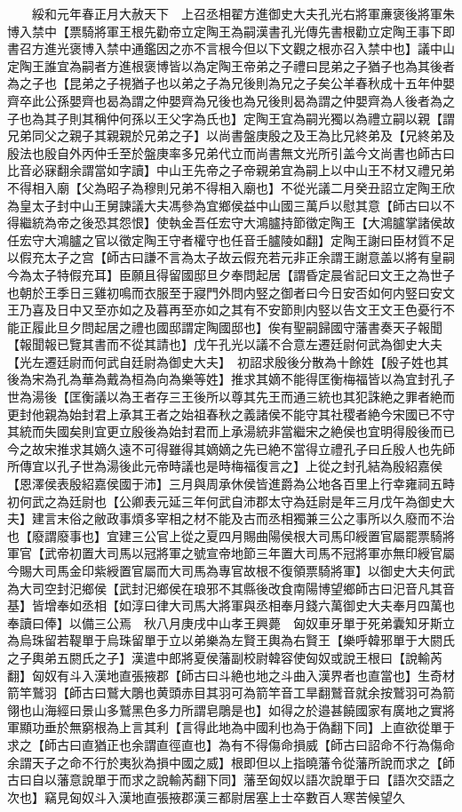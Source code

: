 　　綏和元年春正月大赦天下　上召丞相翟方進御史大夫孔光右將軍亷褒後將軍朱博入禁中【票騎將軍王根先勸帝立定陶王為嗣漢書孔光傳先書根勸立定陶王事下即書召方進光褒博入禁中通鑑因之亦不言根今但以下文觀之根亦召入禁中也】議中山定陶王誰宜為嗣者方進根褒博皆以為定陶王帝弟之子禮曰昆弟之子猶子也為其後者為之子也【昆弟之子視猶子也以弟之子為兄後則為兄之子矣公羊春秋成十五年仲嬰齊卒此公孫嬰齊也曷為謂之仲嬰齊為兄後也為兄後則曷為謂之仲嬰齊為人後者為之子也為其子則其稱仲何孫以王父字為氏也】定陶王宜為嗣光獨以為禮立嗣以親【謂兄弟同父之親子其親親於兄弟之子】以尚書盤庚殷之及王為比兄終弟及【兄終弟及殷法也殷自外丙仲壬至於盤庚率多兄弟代立而尚書無文光所引盖今文尚書也師古曰比音必寐翻余謂當如字讀】中山王先帝之子帝親弟宜為嗣上以中山王不材又禮兄弟不得相入廟【父為昭子為穆則兄弟不得相入廟也】不從光議二月癸丑詔立定陶王欣為皇太子封中山王舅諫議大夫馮參為宜鄉侯益中山國三萬戶以慰其意【師古曰以不得繼統為帝之後恐其怨恨】使執金吾任宏守大鴻臚持節徵定陶王【大鴻臚掌諸侯故任宏守大鴻臚之官以徵定陶王守者權守也任音壬臚陵如翻】定陶王謝曰臣材質不足以假充太子之宫【師古曰謙不言為太子故云假充若元非正余謂王謝意盖以將有皇嗣今為太子特假充耳】臣願且得留國邸旦夕奉問起居【謂昏定晨省記曰文王之為世子也朝於王季日三雞初鳴而衣服至于寢門外問内竪之御者曰今日安否如何内竪曰安文王乃喜及日中又至亦如之及暮再至亦如之其有不安節則内竪以告文王文王色憂行不能正履此旦夕問起居之禮也國邸謂定陶國邸也】俟有聖嗣歸國守藩書奏天子報聞【報聞報已覽其書而不從其請也】戊午孔光以議不合意左遷廷尉何武為御史大夫【光左遷廷尉而何武自廷尉為御史大夫】　初詔求殷後分散為十餘姓【殷子姓也其後為宋為孔為華為戴為桓為向為樂等姓】推求其嫡不能得匡衡梅福皆以為宜封孔子世為湯後【匡衡議以為王者存三王後所以尊其先王而通三統也其犯誅絶之罪者絶而更封他親為始封君上承其王者之始祖春秋之義諸侯不能守其社稷者絶今宋國已不守其統而失國矣則宜更立殷後為始封君而上承湯統非當繼宋之絶侯也宜明得殷後而已今之故宋推求其嫡久遠不可得雖得其嫡嫡之先已絶不當得立禮孔子曰丘殷人也先師所傳宜以孔子世為湯後此元帝時議也是時梅福復言之】上從之封孔結為殷紹嘉侯【恩澤侯表殷紹嘉侯國于沛】三月與周承休侯皆進爵為公地各百里上行幸雍祠五畤　初何武之為廷尉也【公卿表元延三年何武自沛郡太守為廷尉是年三月戊午為御史大夫】建言末俗之敝政事煩多宰相之材不能及古而丞相獨兼三公之事所以久廢而不治也【廢謂廢事也】宜建三公官上從之夏四月賜曲陽侯根大司馬印綬置官屬罷票騎將軍官【武帝初置大司馬以冠將軍之號宣帝地節三年置大司馬不冠將軍亦無印綬官屬今賜大司馬金印紫綬置官屬而大司馬為專官故根不復領票騎將軍】以御史大夫何武為大司空封汜鄉侯【武封汜鄉侯在琅邪不其縣後改食南陽博望鄉師古曰汜音凡其音基】皆增奉如丞相【如淳曰律大司馬大將軍與丞相奉月錢六萬御史大夫奉月四萬也奉讀曰俸】以備三公焉　秋八月庚戌中山孝王興薨　匈奴車牙單于死弟囊知牙斯立為烏珠留若鞮單于烏珠留單于立以弟樂為左賢王輿為右賢王【樂呼韓邪單于大閼氏之子輿弟五閼氏之子】漢遣中郎將夏侯藩副校尉韓容使匈奴或說王根曰【說輸芮翻】匈奴有斗入漢地直張掖郡【師古曰斗絶也地之斗曲入漢界者也直當也】生奇材箭竿鷲羽【師古曰鷲大鵰也黄頭赤目其羽可為箭竿音工旱翻鷲音就余按鷲羽可為箭翎也山海經曰景山多鷲黑色多力所謂皂鵰是也】如得之於邉甚饒國家有廣地之實將軍顯功垂於無窮根為上言其利【言得此地為中國利也為于偽翻下同】上直欲從單于求之【師古曰直猶正也余謂直徑直也】為有不得傷命損威【師古曰詔命不行為傷命余謂天子之命不行於夷狄為損中國之威】根即但以上指曉藩令從藩所說而求之【師古曰自以藩意說單于而求之說輸芮翻下同】藩至匈奴以語次說單于曰【語次交語之次也】竊見匈奴斗入漢地直張掖郡漢三都尉居塞上士卒數百人寒苦候望久